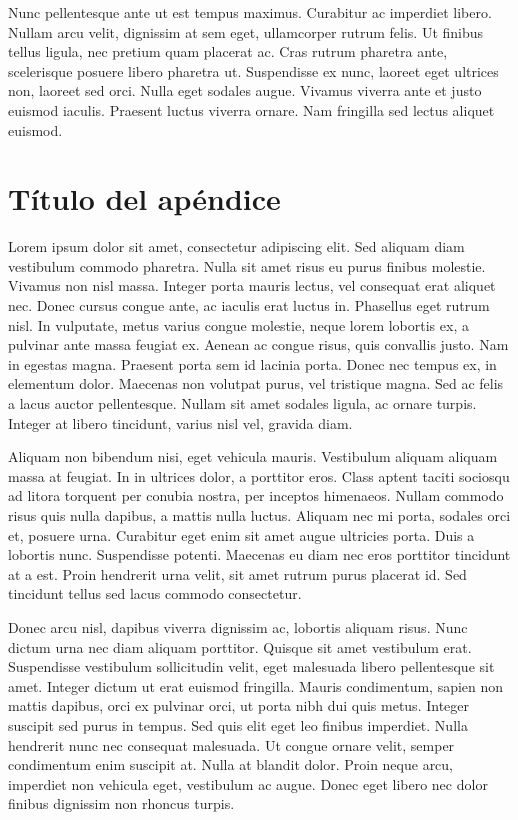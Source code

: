 Nunc pellentesque ante ut est tempus maximus. Curabitur ac imperdiet libero. Nullam arcu velit, dignissim at sem eget, ullamcorper rutrum felis. Ut finibus tellus ligula, nec pretium quam placerat ac. Cras rutrum pharetra ante, scelerisque posuere libero pharetra ut. Suspendisse ex nunc, laoreet eget ultrices non, laoreet sed orci. Nulla eget sodales augue. Vivamus viverra ante et justo euismod iaculis. Praesent luctus viverra ornare. Nam fringilla sed lectus aliquet euismod.

 
 
 
 
 
\chapter{Título del apéndice}\label{aped.B}


Lorem ipsum dolor sit amet, consectetur adipiscing elit. Sed aliquam diam vestibulum commodo pharetra. Nulla sit amet risus eu purus finibus molestie. Vivamus non nisl massa. Integer porta mauris lectus, vel consequat erat aliquet nec. Donec cursus congue ante, ac iaculis erat luctus in. Phasellus eget rutrum nisl. In vulputate, metus varius congue molestie, neque lorem lobortis ex, a pulvinar ante massa feugiat ex. Aenean ac congue risus, quis convallis justo. Nam in egestas magna. Praesent porta sem id lacinia porta. Donec nec tempus ex, in elementum dolor. Maecenas non volutpat purus, vel tristique magna. Sed ac felis a lacus auctor pellentesque. Nullam sit amet sodales ligula, ac ornare turpis. Integer at libero tincidunt, varius nisl vel, gravida diam.

Aliquam non bibendum nisi, eget vehicula mauris. Vestibulum aliquam aliquam massa at feugiat. In in ultrices dolor, a porttitor eros. Class aptent taciti sociosqu ad litora torquent per conubia nostra, per inceptos himenaeos. Nullam commodo risus quis nulla dapibus, a mattis nulla luctus. Aliquam nec mi porta, sodales orci et, posuere urna. Curabitur eget enim sit amet augue ultricies porta. Duis a lobortis nunc. Suspendisse potenti. Maecenas eu diam nec eros porttitor tincidunt at a est. Proin hendrerit urna velit, sit amet rutrum purus placerat id. Sed tincidunt tellus sed lacus commodo consectetur.

Donec arcu nisl, dapibus viverra dignissim ac, lobortis aliquam risus. Nunc dictum urna nec diam aliquam porttitor. Quisque sit amet vestibulum erat. Suspendisse vestibulum sollicitudin velit, eget malesuada libero pellentesque sit amet. Integer dictum ut erat euismod fringilla. Mauris condimentum, sapien non mattis dapibus, orci ex pulvinar orci, ut porta nibh dui quis metus. Integer suscipit sed purus in tempus. Sed quis elit eget leo finibus imperdiet. Nulla hendrerit nunc nec consequat malesuada. Ut congue ornare velit, semper condimentum enim suscipit at. Nulla at blandit dolor. Proin neque arcu, imperdiet non vehicula eget, vestibulum ac augue. Donec eget libero nec dolor finibus dignissim non rhoncus turpis.

